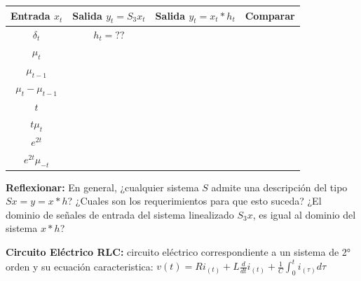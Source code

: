 \documentclass[12pt,a4paper]{report}
\begin{document}
\begin{enumerate}[label=\alph*)]
      \begin{table}[h!]
        \centering
        \begin{tabular}{|c|c|c|c|}
          \hline
          \textbf{Entrada $x_t$} & \textbf{Salida $y_t = S_3{x_t}$} & \textbf{Salida $y_t = x_t * h_t$} & \textbf{Comparar}\\
          \hline
          $\delta_t$ & $h_t = ??$ & &\\
          \hline
          $\mu_t$ & & &\\
          \hline
          $\mu_{t-1}$ & & &\\
          \hline
          $\mu_t - \mu_{t-1}$ & & &\\
          \hline
          $t$ & & &\\
          \hline
          $t\mu_{t}$ & & &\\
          \hline
          $e^{2t}$ & & &\\
          \hline
          $e^{2t}\mu_{-t}$ & & &\\
          \hline

        \end{tabular}
      \end{table}
      \textbf{Reflexionar:} En general, ¿cualquier sistema $S$ admite una descripción del tipo $S{x} = y = x * h$?
      ¿Cuales son los requerimientos para que esto suceda? ¿El dominio de señales de entrada del sistema linealizado
      $S_3{x}$, es igual al dominio del sistema $x * h$?


  \end{enumerate}

  \textbf{Circuito Eléctrico RLC:} circuito eléctrico correspondiente a un sistema de 2° orden y su ecuación caracteristica: $v(t) = Ri_{(t)} + L \frac{d}{dt} i_{(t)} + \frac{1}{C} \int_{0}^{t} i_{(\tau)} d\tau$
\end{document}
